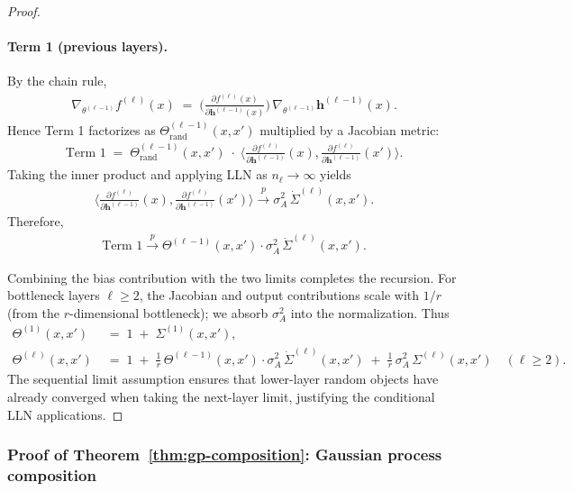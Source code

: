 \begin{proof}
\paragraph{Term 1 (previous layers).}
By the chain rule,
\begin{align}
\nabla_{\theta^{(\ell-1)}} f^{(\ell)}(x) \;=\; \Big(\frac{\partial f^{(\ell)}(x)}{\partial \bm{h}^{(\ell-1)}(x)}\Big)\,\nabla_{\theta^{(\ell-1)}} \bm{h}^{(\ell-1)}(x).
\end{align}
Hence Term 1 factorizes as \(\Theta^{(\ell-1)}_{\mathrm{rand}}(x,x')\) multiplied by a Jacobian metric:
\begin{align}
\text{Term 1} \;=\; \Theta^{(\ell-1)}_{\mathrm{rand}}(x,x')\;\cdot\;\Big\langle \frac{\partial f^{(\ell)}}{\partial \bm{h}^{(\ell-1)}}(x), \frac{\partial f^{(\ell)}}{\partial \bm{h}^{(\ell-1)}}(x') \Big\rangle.
\end{align}
Taking the inner product and applying LLN as \(n_\ell\to\infty\) yields
\begin{align}
\Big\langle \frac{\partial f^{(\ell)}}{\partial \bm{h}^{(\ell-1)}}(x), \frac{\partial f^{(\ell)}}{\partial \bm{h}^{(\ell-1)}}(x') \Big\rangle \xrightarrow{p} \sigma_A^2\,\dot{\Sigma}^{(\ell)}(x,x').
\end{align}
Therefore,
\begin{align}
\text{Term 1} \xrightarrow{p} \Theta^{(\ell-1)}(x,x')\cdot \sigma_A^2\,\dot{\Sigma}^{(\ell)}(x,x').
\end{align}

Combining the bias contribution with the two limits completes the recursion. For bottleneck layers \( \ell \ge 2 \), the Jacobian and output contributions scale with \( 1/r \) (from the \( r \)-dimensional bottleneck); we absorb \( \sigma_A^2 \) into the normalization. Thus
\begin{align}
\Theta^{(1)}(x,x') &\;=\; 1 \;+\; \Sigma^{(1)}(x,x'),\\
\Theta^{(\ell)}(x,x') &\;=\; 1 \;+\; \frac{1}{r}\,\Theta^{(\ell-1)}(x,x')\cdot\sigma_A^2\,\dot{\Sigma}^{(\ell)}(x,x') \;+\; \frac{1}{r}\,\sigma_A^2\,\Sigma^{(\ell)}(x,x')\quad (\ell\ge2).
\end{align}
The sequential limit assumption ensures that lower-layer random objects have already converged when taking the next-layer limit, justifying the conditional LLN applications.
\end{proof}

\subsubsection{Proof of Theorem~\ref{thm:gp-composition}: Gaussian process composition}
\label{appendix:proof-gp-composition}

